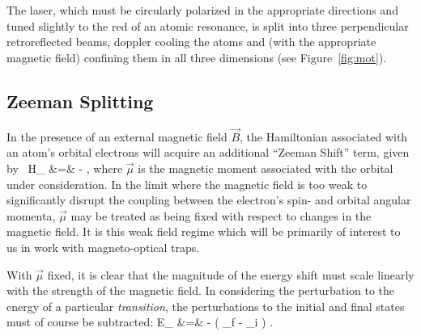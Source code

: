 The laser, which must be circularly polarized in the appropriate directions and tuned slightly to the red of an atomic resonance, is split into three perpendicular retroreflected beams, doppler cooling the atoms and (with the appropriate magnetic field) confining them in all three dimensions (see Figure~\ref{fig:mot}).  





\subsection{Zeeman Splitting}
In the presence of an external magnetic field $\vec{B}$, the Hamiltonian associated with an atom's orbital electrons will acquire an additional ``Zeeman Shift'' term, given by~\cite{corney}
\bea
\label{zeeman_hamiltonian}
H_{} &=& - \vec{\mu}\cdot {},
\eea
where $\vec{\mu}$ is the magnetic moment associated with the orbital under consideration.  In the limit where the magnetic field is too weak to significantly disrupt the coupling between the electron's spin- and orbital angular momenta, $\vec{\mu}$ may be treated as being fixed with respect to changes in the magnetic field.  It is this weak field regime which will be primarily of interest to us in work with magneto-optical traps.


With $\vec{\mu}$ fixed, it is clear that the magnitude of the energy shift must scale linearly with the strength of the magnetic field.  In considering the perturbation to the energy of a particular \emph{transition}, the perturbations to the initial and final states must of course be subtracted:
\bea
\Delta E_{} &=& - \left( \vec{\mu}_f - \vec{\mu}_i \right) \cdot {}.
\eea 



